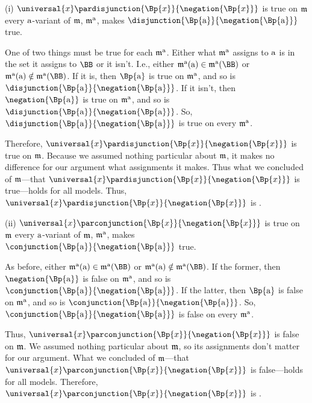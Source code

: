 \begin{PROOF}
(i) $\universal{\variable{x}}\pardisjunction{\Bp{\variable{x}}}{\negation{\Bp{\variable{x}}}}$ is true on $\mathfrak{m}$ \Iff every $\mathrm{a}$-variant of $\mathfrak{m}$, $\mathfrak{m^{\mathrm{\mathrm{a}}}_{\mathrm{}}}$, makes $\disjunction{\Bp{\constant{a}}}{\negation{\Bp{\constant{a}}}}$ true.

One of two things must be true for each $\mathfrak{m^{\mathrm{\mathrm{a}}}_{\mathrm{}}}$.  Either what $\mathfrak{m^{\mathrm{\mathrm{a}}}_{\mathrm{}}}$ assigns to $\mathrm{a}$ is in the set it assigns to $\BB$ or it isn't.  I.e., either $\As{\constant{a}}{}(\constant{a})\in\As{\constant{a}}{}(\BB)$ or  $\As{\constant{a}}{}(\constant{a})\notin\As{\constant{a}}{}(\BB)$.  If it is, then $\Bp{\constant{a}}$ is true on $\mathfrak{m^{\mathrm{\mathrm{a}}}_{\mathrm{}}}$, and so is $\disjunction{\Bp{\constant{a}}}{\negation{\Bp{\constant{a}}}}$.  If it isn't, then $\negation{\Bp{\constant{a}}}$ is true on $\mathfrak{m^{\mathrm{\mathrm{a}}}_{\mathrm{}}}$, and so is $\disjunction{\Bp{\constant{a}}}{\negation{\Bp{\constant{a}}}}$.  So, $\disjunction{\Bp{\constant{a}}}{\negation{\Bp{\constant{a}}}}$ is true on every $\mathfrak{m^{\mathrm{\mathrm{a}}}_{\mathrm{}}}$.

Therefore, $\universal{\variable{x}}\pardisjunction{\Bp{\variable{x}}}{\negation{\Bp{\variable{x}}}}$ is true on $\mathfrak{m}$.  Because we assumed nothing particular about $\mathfrak{m}$, it makes no difference for our argument what assignments it makes.  Thus what we concluded of $\mathfrak{m}$---that $\universal{\variable{x}}\pardisjunction{\Bp{\variable{x}}}{\negation{\Bp{\variable{x}}}}$ is true---holds for all models.  Thus, $\universal{\variable{x}}\pardisjunction{\Bp{\variable{x}}}{\negation{\Bp{\variable{x}}}}$ is .

(ii) $\universal{\variable{x}}\parconjunction{\Bp{\variable{x}}}{\negation{\Bp{\variable{x}}}}$ is true on $\mathfrak{m}$ \Iff every $\mathrm{a}$-variant of $\mathfrak{m}$, $\mathfrak{m^{\mathrm{\mathrm{a}}}_{\mathrm{}}}$, makes $\conjunction{\Bp{\constant{a}}}{\negation{\Bp{\constant{a}}}}$ true.

As before, either $\As{\constant{a}}{}(\constant{a})\in\As{\constant{a}}{}(\BB)$ or  $\As{\constant{a}}{}(\constant{a})\notin\As{\constant{a}}{}(\BB)$.  If the former, then $\negation{\Bp{\constant{a}}}$ is false on $\mathfrak{m^{\mathrm{\mathrm{a}}}_{\mathrm{}}}$, and so is $\conjunction{\Bp{\constant{a}}}{\negation{\Bp{\constant{a}}}}$.  If the latter, then $\Bp{\constant{a}}$ is false on $\mathfrak{m^{\mathrm{\mathrm{a}}}_{\mathrm{}}}$, and so is $\conjunction{\Bp{\constant{a}}}{\negation{\Bp{\constant{a}}}}$.  So, $\conjunction{\Bp{\constant{a}}}{\negation{\Bp{\constant{a}}}}$ is false on every $\mathfrak{m^{\mathrm{\mathrm{a}}}_{\mathrm{}}}$.

Thus, $\universal{\variable{x}}\parconjunction{\Bp{\variable{x}}}{\negation{\Bp{\variable{x}}}}$ is false on $\mathfrak{m}$.  We assumed nothing particular about $\mathfrak{m}$, so its assignments don't matter for our argument.  What we concluded of $\mathfrak{m}$---that $\universal{\variable{x}}\parconjunction{\Bp{\variable{x}}}{\negation{\Bp{\variable{x}}}}$ is false---holds for all models.  Therefore, $\universal{\variable{x}}\parconjunction{\Bp{\variable{x}}}{\negation{\Bp{\variable{x}}}}$ is .
\end{PROOF}
